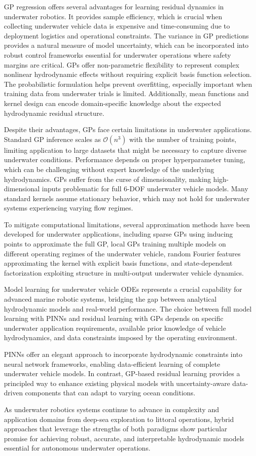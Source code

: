 GP regression offers several advantages for learning residual dynamics in underwater robotics. It provides sample efficiency, which is crucial when collecting underwater vehicle data is expensive and time-consuming due to deployment logistics and operational constraints. The variance in GP predictions provides a natural measure of model uncertainty, which can be incorporated into robust control frameworks essential for underwater operations where safety margins are critical. GPs offer non-parametric flexibility to represent complex nonlinear hydrodynamic effects without requiring explicit basis function selection. The probabilistic formulation helps prevent overfitting, especially important when training data from underwater trials is limited. Additionally, mean functions and kernel design can encode domain-specific knowledge about the expected hydrodynamic residual structure.

Despite their advantages, GPs face certain limitations in underwater applications. Standard GP inference scales as $\mathcal{O}(n^3)$ with the number of training points, limiting application to large datasets that might be necessary to capture diverse underwater conditions. Performance depends on proper hyperparameter tuning, which can be challenging without expert knowledge of the underlying hydrodynamics. GPs suffer from the curse of dimensionality, making high-dimensional inputs problematic for full 6-DOF underwater vehicle models. Many standard kernels assume stationary behavior, which may not hold for underwater systems experiencing varying flow regimes.

To mitigate computational limitations, several approximation methods have been developed for underwater applications, including sparse GPs using inducing points to approximate the full GP, local GPs training multiple models on different operating regimes of the underwater vehicle, random Fourier features approximating the kernel with explicit basis functions, and state-dependent factorization exploiting structure in multi-output underwater vehicle dynamics.

Model learning for underwater vehicle ODEs represents a crucial capability for advanced marine robotic systems, bridging the gap between analytical hydrodynamic models and real-world performance. The choice between full model learning with PINNs and residual learning with GPs depends on specific underwater application requirements, available prior knowledge of vehicle hydrodynamics, and data constraints imposed by the operating environment.

PINNs offer an elegant approach to incorporate hydrodynamic constraints into neural network frameworks, enabling data-efficient learning of complete underwater vehicle models. In contrast, GP-based residual learning provides a principled way to enhance existing physical models with uncertainty-aware data-driven components that can adapt to varying ocean conditions.

As underwater robotics systems continue to advance in complexity and application domains from deep-sea exploration to littoral operations, hybrid approaches that leverage the strengths of both paradigms show particular promise for achieving robust, accurate, and interpretable hydrodynamic models essential for autonomous underwater operations.